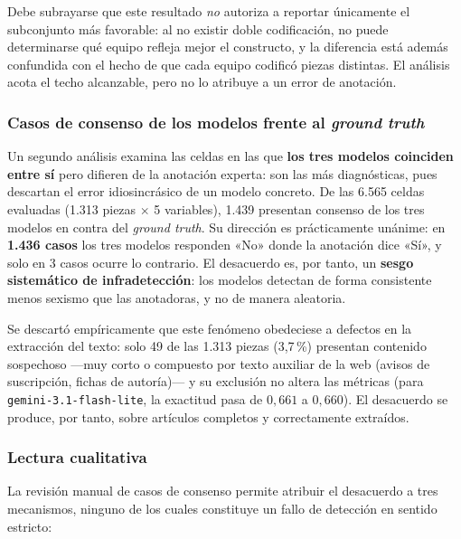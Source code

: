 Debe subrayarse que este resultado \emph{no} autoriza a reportar únicamente el
subconjunto más favorable: al no existir doble codificación, no puede
determinarse qué equipo refleja mejor el constructo, y la diferencia está además
confundida con el hecho de que cada equipo codificó piezas distintas. El
análisis acota el techo alcanzable, pero no lo atribuye a un error de anotación.

\subsubsection{Casos de consenso de los modelos frente al \textit{ground truth}}

Un segundo análisis examina las celdas en las que \textbf{los tres modelos
coinciden entre sí} pero difieren de la anotación experta: son las más
diagnósticas, pues descartan el error idiosincrásico de un modelo concreto. De
las 6.565 celdas evaluadas (1.313 piezas $\times$ 5 variables), 1.439 presentan
consenso de los tres modelos en contra del \textit{ground truth}. Su dirección
es prácticamente unánime: en \textbf{1.436 casos} los tres modelos responden «No»
donde la anotación dice «Sí», y solo en 3 casos ocurre lo contrario. El
desacuerdo es, por tanto, un \textbf{sesgo sistemático de infradetección}: los
modelos detectan de forma consistente menos sexismo que las anotadoras, y no de
manera aleatoria.

Se descartó empíricamente que este fenómeno obedeciese a defectos en la
extracción del texto: solo 49 de las 1.313 piezas (3,7\,\%) presentan
contenido sospechoso —muy corto o compuesto por texto auxiliar de la web
(avisos de suscripción, fichas de autoría)— y su exclusión no altera las
métricas (para \texttt{gemini-3.1-flash-lite}, la exactitud pasa de $0,661$ a
$0,660$). El desacuerdo se produce, por tanto, sobre artículos completos y
correctamente extraídos.

\subsubsection{Lectura cualitativa}

La revisión manual de casos de consenso permite atribuir el desacuerdo a tres
mecanismos, ninguno de los cuales constituye un fallo de detección en sentido
estricto:

